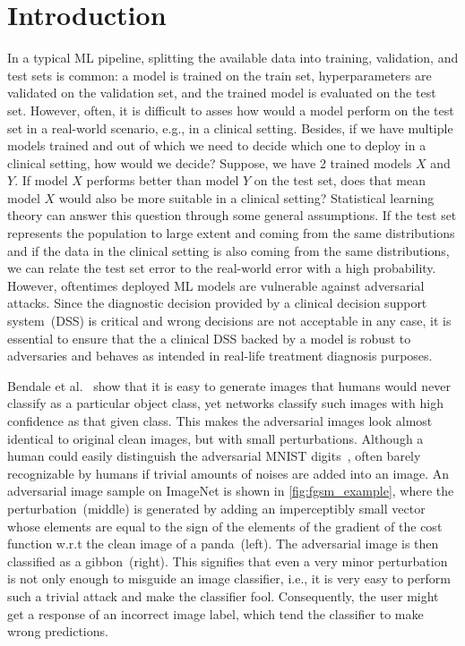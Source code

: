 \section{Introduction}
In a typical ML pipeline, splitting the available data into training, validation, and test sets is common: a model is trained on the train set, hyperparameters are validated on the validation set, and the trained model is evaluated on the test set. However, often, it is difficult to asses how would a model perform on the test set in a real-world scenario, e.g., in a clinical setting. Besides, if we have multiple models trained and out of which we need to decide which one to deploy in a clinical setting, how would we decide? Suppose, we have 2 trained models $X$ and $Y$. If model $X$ performs better than model $Y$ on the test set, does that mean model $X$ would also be more suitable in a clinical setting? Statistical learning theory can answer this question through some general assumptions. 
If the test set represents the population to large extent and coming from the same distributions and if the data in the clinical setting is also coming from the same distributions, we can relate the test set error to the real-world error with a high probability. 
However, oftentimes deployed ML models are vulnerable against adversarial attacks. Since the diagnostic decision provided by a clinical decision support system~(DSS) is critical and wrong decisions are not acceptable in any case, it is essential to ensure that the a clinical DSS backed by a model is robust to adversaries and behaves as intended in real-life treatment diagnosis purposes. 

\hspace*{3.5mm} Bendale et al.~\cite{OOD18} show that it is easy to generate images that humans would never classify as a particular object class, yet networks classify such images with high confidence as that given class. This makes the adversarial images look almost identical to original clean images, but with small perturbations. Although a human could easily distinguish the adversarial MNIST digits~\cite{yuan2019adversarial}, often barely recognizable by humans if trivial amounts of noises are added into an image. An adversarial image sample on ImageNet is shown in \cref{fig:fgsm_example}, where the perturbation~(middle) is generated by adding an imperceptibly small vector whose elements are equal to the sign of the elements of the gradient of the cost function w.r.t the clean image of a panda~(left). The adversarial image is then classified as a gibbon~(right). This signifies that even a very minor perturbation is not only enough to misguide an image classifier, i.e., it is very easy to perform such a trivial attack and make the classifier fool. Consequently, the user might get a response of an incorrect image label, which tend the classifier to make wrong predictions. 

